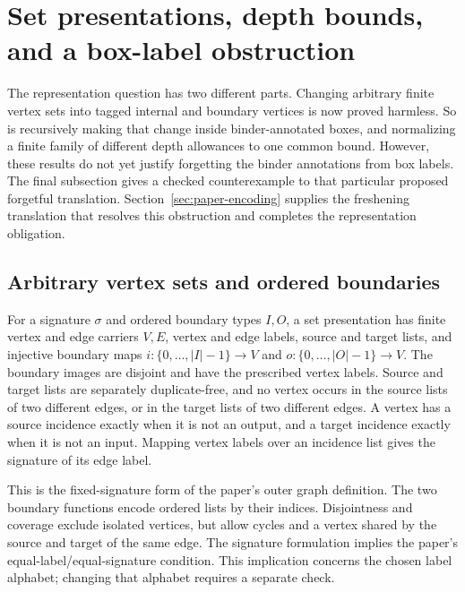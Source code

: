\section{Set presentations, depth bounds, and a box-label obstruction}
\label{sec:set-presentations}

The representation question has two different parts. Changing arbitrary finite
vertex sets into tagged internal and boundary vertices is now proved harmless.
So is recursively making that change inside binder-annotated boxes, and
normalizing a finite family of different depth allowances to one common bound.
However, these results do not yet justify forgetting the binder annotations
from box labels. The final subsection gives a checked counterexample to that
particular proposed forgetful translation. Section~\ref{sec:paper-encoding} supplies the freshening translation that
resolves this obstruction and completes the representation obligation.

\subsection{Arbitrary vertex sets and ordered boundaries}
\begin{definition}
For a signature $\sigma$ and ordered boundary types $I,O$, a set presentation
has finite vertex and edge carriers $V,E$, vertex and edge labels, source and
target lists, and injective boundary maps
$i:\{0,\ldots,|I|-1\}\to V$ and $o:\{0,\ldots,|O|-1\}\to V$.
The boundary images are disjoint and have the prescribed vertex labels.
Source and target lists are separately duplicate-free, and no vertex occurs
in the source lists of two different edges, or in the target lists of two
different edges. A vertex has a source incidence exactly when it is not an
output, and a target incidence exactly when it is not an input. Mapping vertex
labels over an incidence list gives the signature of its edge label.
\end{definition}
This is the fixed-signature form of the paper's outer graph definition.
The two boundary functions encode ordered lists by their indices. Disjointness
and coverage exclude isolated vertices, but allow cycles and a vertex shared
by the source and target of the same edge. The signature formulation implies
the paper's equal-label/equal-signature condition. This implication concerns
the chosen label alphabet; changing that alphabet requires a separate check.


